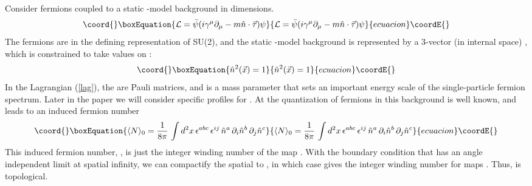 \documentclass[a4paper,prd]{revtex4}
\begin{document}
Consider fermions coupled to a static \myHighlight{$\sigma$}\coordHE{}-model background in \coordHE{} dimensions.
\begin{equation}\coord{}\boxEquation{
{\cal L}=\bar{\psi}(i\gamma^{\mu}\partial_{\mu}-m\hat{n}\cdot \vec{\tau})\psi
\label{lag}
}{
{\cal L}=\bar{\psi}(i\gamma^{\mu}\partial_{\mu}-m\hat{n}\cdot \vec{\tau})\psi
}{ecuacion}\coordE{}\end{equation}
The fermions are in the defining representation of SU(2), and the static
\myHighlight{$\sigma$}\coordHE{}-model background is represented by a 3-vector (in internal
space) \coordHE{}, which is constrained to take values on \coordHE{}:
\begin{equation}\coord{}\boxEquation{
\hat{n}^{2}(\vec{x})=1
\label{constraint}
}{
\hat{n}^{2}(\vec{x})=1
}{ecuacion}\coordE{}\end{equation}
In the Lagrangian (\ref{lag}), the \coordHE{} are Pauli matrices,
and \coordHE{} is a mass parameter that sets an important energy scale of the
single-particle fermion spectrum. Later in the paper we will consider
specific profiles for
\coordHE{}.  At
\coordHE{} the quantization of fermions in this background is well known,
and leads to an induced fermion number
\cite{jaro1,carena,aw}
\begin{equation}\coord{}\boxEquation{
\langle N\rangle_0=\frac{1}{8\pi}\,  \int d^{2}x\,  \epsilon^{abc}\, 
\epsilon^{ij}\, \hat{n}^{a}\,\partial_i\hat{n}^{b}\, \partial_j\hat{n}^{c}
\label{nzero}
}{
\langle N\rangle_0=\frac{1}{8\pi}\,  \int d^{2}x\,  \epsilon^{abc}\, 
\epsilon^{ij}\, \hat{n}^{a}\,\partial_i\hat{n}^{b}\, \partial_j\hat{n}^{c}
}{ecuacion}\coordE{}\end{equation}
This induced fermion number, \coordHE{}, is just the integer
winding number of the map \coordHE{}. With the boundary
condition that \coordHE{} has an angle independent limit at
spatial infinity, we can compactify the spatial \coordHE{} to \coordHE{},
in which case \coordHE{} gives the integer winding number
for maps \coordHE{}. Thus, \coordHE{} is
topological.
\end{document}
